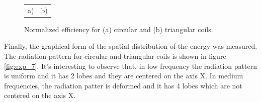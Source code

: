 \documentclass[a4paper,10pt]{article}
\begin{document}
\begin{figure}[tbp]
\begin{center}
{\begin{tabular}{cc}
a)&b)\\
\end{tabular}
} \caption{Normalized efficiency for (a) circular and (b) triangular coils.}\label{fig:exp_6}
\end{center}
\end{figure}

Finally, the graphical form of the spatial distribution of the energy was measured. The radiation pattern for circular and triangular coils is shown in figure \ref{fig:exp_7}. It's interesting to observe that, in low frequency the radiation pattern is uniform and it has 2 lobes and they are centered on the axis X. In medium frequencies, the radiation patter is deformed and it has 4 lobes which are not centered on the axis X.

\begin{figure}[tbp]
\begin{center}
\end{center}
\end{figure}
\end{document}
